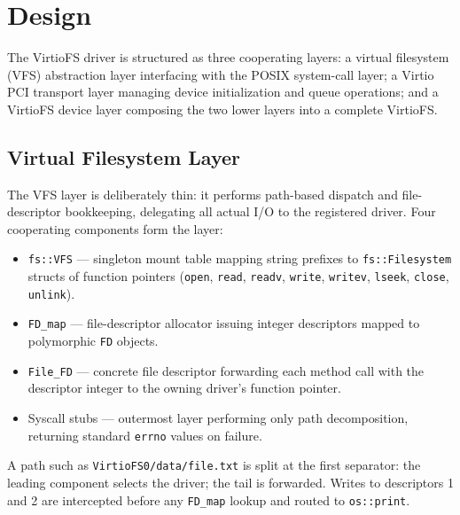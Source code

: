 \documentclass[12pt, a4paper, oneside]{report}
\begin{document}
\chapter{Design}
\label{chap:design}

The VirtioFS driver is structured as three cooperating layers: a virtual
filesystem (VFS) abstraction layer interfacing with the POSIX system-call layer;
a Virtio PCI transport layer managing device initialization and queue operations;
and a VirtioFS device layer composing the two lower layers into a complete
VirtioFS.

\section{Virtual Filesystem Layer}
\label{sec:design-vfs}

The VFS layer is deliberately thin: it performs path-based dispatch and
file-descriptor bookkeeping, delegating all actual I/O to the registered driver.
Four cooperating components form the layer:

\begin{itemize}
  \item \texttt{fs::VFS} --- singleton mount table mapping string prefixes to
        \texttt{fs::Filesystem} structs of function pointers (\texttt{open},
        \texttt{read}, \texttt{readv}, \texttt{write}, \texttt{writev},
        \texttt{lseek}, \texttt{close}, \texttt{unlink}).
  \item \texttt{FD\_map} --- file-descriptor allocator issuing integer
        descriptors mapped to polymorphic \texttt{FD} objects.
  \item \texttt{File\_FD} --- concrete file descriptor forwarding each method
        call with the descriptor integer to the owning driver's function pointer.
  \item Syscall stubs --- outermost layer performing only path decomposition,
        returning standard \texttt{errno} values on failure.
\end{itemize}

A path such as \texttt{VirtioFS0/data/file.txt} is split at the first separator:
the leading component selects the driver; the tail is forwarded.  Writes to
descriptors 1 and 2 are intercepted before any \texttt{FD\_map} lookup and
routed to \texttt{os::print}.
\end{document}
